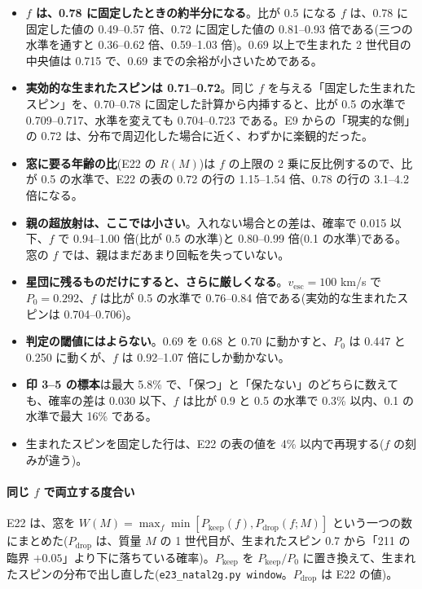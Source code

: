 \begin{itemize}
\item \textbf{$f$ は、0.78 に固定したときの約半分になる}。比が 0.5 になる $f$ は、0.78 に固定した値の 0.49--0.57 倍、0.72 に固定した値の 0.81--0.93 倍である(三つの水準を通すと 0.36--0.62 倍、0.59--1.03 倍)。0.69 以上で生まれた 2 世代目の中央値は 0.715 で、0.69 までの余裕が小さいためである。
\item \textbf{実効的な生まれたスピンは 0.71--0.72}。同じ $f$ を与える「固定した生まれたスピン」を、0.70--0.78 に固定した計算から内挿すると、比が 0.5 の水準で 0.709--0.717、水準を変えても 0.704--0.723 である。E9 からの「現実的な側」の 0.72 は、分布で周辺化した場合に近く、わずかに楽観的だった。
\item \textbf{窓に要る年齢の比}(E22 の $R(M)$)は $f$ の上限の 2 乗に反比例するので、比が 0.5 の水準で、E22 の表の 0.72 の行の 1.15--1.54 倍、0.78 の行の 3.1--4.2 倍になる。
\item \textbf{親の超放射は、ここでは小さい}。入れない場合との差は、確率で 0.015 以下、$f$ で 0.94--1.00 倍(比が 0.5 の水準)と 0.80--0.99 倍(0.1 の水準)である。窓の $f$ では、親はまだあまり回転を失っていない。
\item \textbf{星団に残るものだけにすると、さらに厳しくなる}。$v_\mathrm{esc}=100$ km/s で $P_0=0.292$、$f$ は比が 0.5 の水準で 0.76--0.84 倍である(実効的な生まれたスピンは 0.704--0.706)。
\item \textbf{判定の閾値にはよらない}。0.69 を 0.68 と 0.70 に動かすと、$P_0$ は 0.447 と 0.250 に動くが、$f$ は 0.92--1.07 倍にしか動かない。
\item \textbf{印 3--5 の標本}は最大 5.8\% で、「保つ」と「保たない」のどちらに数えても、確率の差は 0.030 以下、$f$ は比が 0.9 と 0.5 の水準で 0.3\% 以内、0.1 の水準で最大 16\% である。
\item 生まれたスピンを固定した行は、E22 の表の値を 4\% 以内で再現する($f$ の刻みが違う)。
\end{itemize}

\paragraph{同じ $f$ で両立する度合い}
E22 は、窓を $W(M)=\max_f\min[P_\mathrm{keep}(f),P_\mathrm{drop}(f;M)]$ という一つの数にまとめた($P_\mathrm{drop}$ は、質量 $M$ の 1 世代目が、生まれたスピン 0.7 から「211 の臨界 $+0.05$」より下に落ちている確率)。$P_\mathrm{keep}$ を $P_\mathrm{keep}/P_0$ に置き換えて、生まれたスピンの分布で出し直した(\texttt{e23\_natal2g.py window}。$P_\mathrm{drop}$ は E22 の値)。

